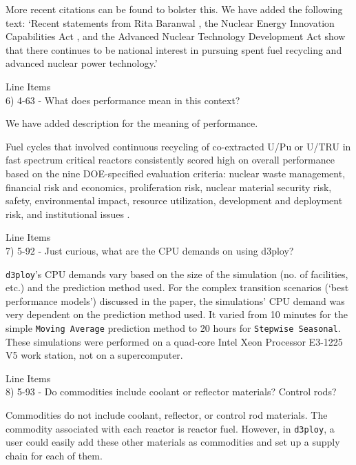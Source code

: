 \documentclass[answers,11pt]{exam}
\newcommand{\deploy}{\texttt{d3ploy}\xspace}%
\begin{document}
\begin{questions}
\begin{solution}
More recent citations can be found to bolster this. We have added the following text: 
`Recent statements from Rita Baranwal \cite{noauthor_new_2019}, the Nuclear Energy Innovation 
Capabilities Act \cite{crapo_s97_2018}, and the Advanced Nuclear Technology Development Act \cite{latta_hr590_2017} 
show that there continues to be national interest in pursuing spent fuel recycling and advanced nuclear power 
technology.'
\end{solution}

\question Line Items \\
6) 4-63 - What does performance mean in this context?

\begin{solution}
We have added description for the meaning of performance. 

Fuel cycles that involved continuous recycling
of co-extracted U/Pu or U/TRU in fast spectrum critical reactors
consistently scored high on overall performance based on the nine 
DOE-specified evaluation criteria: nuclear waste management, 
financial risk and economics, 
proliferation risk, nuclear material security risk, safety, 
environmental impact, resource utilization, development and deployment 
risk, and institutional issues \cite{wigeland_nuclear_2014}. 
\end{solution}

\question Line Items \\
7) 5-92 - Just curious, what are the CPU demands on using d3ploy?

\begin{solution}
\deploy's CPU demands vary based on the size of the simulation (no. of facilities, etc.) 
and the prediction method used. 
For the complex transition scenarios (`best performance models') discussed in the paper, 
the simulations' CPU demand was very dependent on the prediction method used. It varied from 
10 minutes for the simple \texttt{Moving Average} prediction method to 20 hours for 
\texttt{Stepwise Seasonal}. These simulations were performed on a quad-core Intel Xeon Processor 
E3-1225 V5 work station, not on a supercomputer. 
\end{solution}

\question Line Items \\
8) 5-93 - Do commodities include coolant or reflector materials? Control rods?
\begin{solution}
Commodities do not include coolant, reflector, or control rod materials. The commodity associated 
with each reactor is reactor fuel. However, in \deploy, a user could easily add these other 
materials as commodities and set up a supply chain for each of them.  
\end{solution}


\end{questions}
\end{document}
